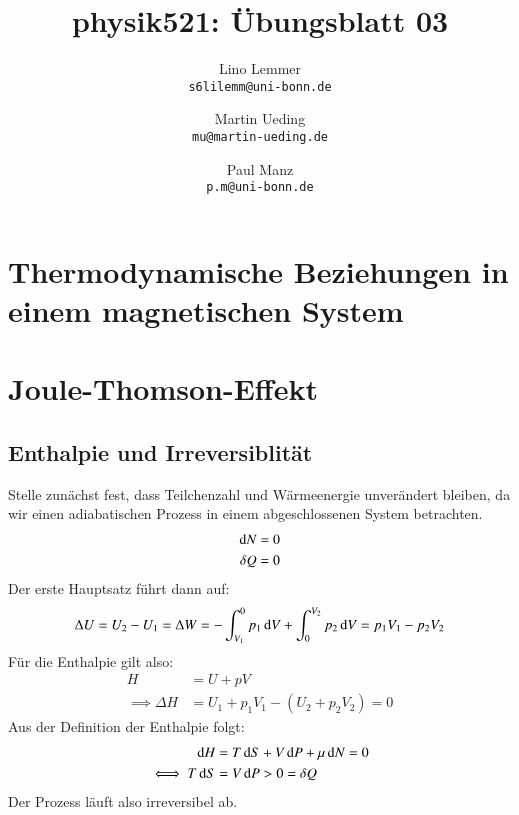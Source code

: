 

\setcounter{section}{1}
\renewcommand\thesection{H\,3.\arabic{section}}
\renewcommand\thesubsection{\thesection.\alph{subsection}}

\title{physik521: Übungsblatt 03}
\author{%
    Lino Lemmer \\ \small{\texttt{s6lilemm@uni-bonn.de}}
    \and
    Martin Ueding \\ \small{\texttt{mu@martin-ueding.de}}
    \and
    Paul Manz \\ \small{\texttt{p.m@uni-bonn.de}}
}


\maketitle

\section{Thermodynamische Beziehungen in einem magnetischen System}
\subsection{}



\section{Joule-Thomson-Effekt}
\subsection{Enthalpie und Irreversiblität}
Stelle zunächst fest, dass Teilchenzahl und Wärmeenergie unverändert bleiben, da wir einen adiabatischen Prozess in einem abgeschlossenen System betrachten.
\begin{align*}
\dif N &= 0 \\
\delta Q &= 0 \\
\end{align*}
Der erste Hauptsatz führt dann auf:
\[ \Delta U = U_2 - U_1 = \Delta W = -\int_{V_1}^{0} p_1 \dif V  + \int_{0}^{V_2} p_2 \dif V= p_1 V_1 - p_2 V_2 \]
Für die Enthalpie gilt also:
\begin{align*}
H &= U+pV \\
\implies \Delta H &= U_1 + p_1 V_1 - (U_2 + p_2 V_2) =0 
\end{align*}  
Aus der Definition der Enthalpie folgt:
\begin{align*}
\dif H &= T \dif S + V \dif P + \mu \dif N = 0 \\
\iff T \dif S &= V \dif P > 0 = \delta Q \\
\end{align*}
Der Prozess läuft also irreversibel ab.


